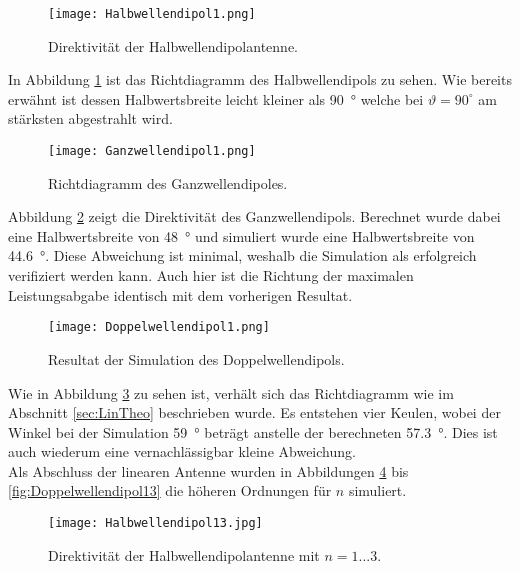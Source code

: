 \begin{figure}[!ht]
	\centering
    \texttt{[image: Halbwellendipol1.png]}
    \caption{Direktivität der Halbwellendipolantenne.}
    \label{fig:Halbwellendipol1}
\end{figure}

In Abbildung \ref{fig:Halbwellendipol1} ist das Richtdiagramm des Halbwellendipols zu sehen. Wie bereits erwähnt ist dessen Halbwertsbreite leicht kleiner als \SI{90}{\degree} welche bei $\vartheta = 90^\circ$ am stärksten abgestrahlt wird.

\begin{figure}[!ht]
	\centering
    \texttt{[image: Ganzwellendipol1.png]}
    \caption{Richtdiagramm des Ganzwellendipoles.}
    \label{fig:Ganzwellendipol1}
\end{figure}

Abbildung \ref{fig:Ganzwellendipol1} zeigt die Direktivität des Ganzwellendipols. Berechnet wurde dabei eine Halbwertsbreite von \SI{48}{\degree} und simuliert wurde eine Halbwertsbreite von \SI{44.6}{\degree}. Diese Abweichung ist minimal, weshalb die Simulation als erfolgreich verifiziert werden kann. Auch hier ist die Richtung der maximalen Leistungsabgabe identisch mit dem vorherigen Resultat.

\begin{figure}[!ht]
	\centering
    \texttt{[image: Doppelwellendipol1.png]}
    \caption{Resultat der Simulation des Doppelwellendipols.}
    \label{fig:Doppelwellendipol1}
\end{figure}

Wie in Abbildung \ref{fig:Doppelwellendipol1} zu sehen ist, verhält sich das Richtdiagramm wie im Abschnitt \ref{sec:LinTheo} beschrieben wurde. Es entstehen vier Keulen, wobei der Winkel bei der Simulation \SI{59}{\degree} beträgt anstelle der berechneten \SI{57.3}{\degree}. Dies ist auch wiederum eine vernachlässigbar kleine Abweichung.\\

Als Abschluss der linearen Antenne wurden in Abbildungen \ref{fig:Halbwellendipol13} bis \ref{fig:Doppelwellendipol13} die höheren Ordnungen für $n$ simuliert. 

\newpage

\begin{figure}[!ht]
	\centering
    \texttt{[image: Halbwellendipol13.jpg]}
    \caption{Direktivität der Halbwellendipolantenne mit $n = 1 ... 3$.}
    \label{fig:Halbwellendipol13}
\end{figure}


